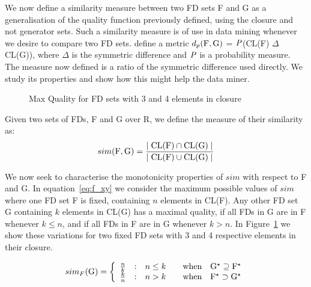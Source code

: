 We now define a similarity measure between two FD sets F and G as
a generalisation of the quality function previously defined, using the
closure and not generator sets. Such a
similarity measure is of use in data mining whenever we desire to
compare two FD sets. \cite{km95} define a metric $d_p({\rm F},{\rm G})$ = ${\it
P}$(CL(F) $\Delta$ CL(G)), where $\Delta$ is the symmetric difference and
${\it P}$ is a probability measure. The measure now defined is a
ratio of the symmetric difference used directly. We study its
properties and show how this might help the data miner.

\begin{figure}
\centerline{}
\caption{\label{graph:simquality}{Max Quality for FD sets with 3 and 4
elements in closure}}
\end{figure}

\begin{definition}
\begin{rm}
Given two sets of FDs, F and G over R, we define the measure of
their similarity as:
\begin{displaymath}
sim({\rm F}, {\rm G}) = \frac{\mid {\rm CL(F)} \cap {\rm CL(G)} \mid}{\mid {\rm CL(F)} \cup {\rm CL(G)} \mid }
\end{displaymath}
\end{rm}
\end{definition}

We now seek to characterise the monotonicity properties of $sim$ with respect
to F and G. In equation~\ref{eq:f_xy} we consider the maximum
possible values of $sim$ where one FD set F is fixed, containing $n$
elements in CL(F). Any other FD set G
containing $k$ elements in CL(G) has a maximal quality, 
if all FDs in G are in F
whenever $k \le n$, and if all FDs in F are in G whenever $k > n$.
In Figure~\ref{graph:simquality} we show 
these variations for two fixed FD sets with 3 and 4 respective
elements in their closure.

\begin{equation}\label{eq:f_xy}
sim_F({\rm G}) = \left\{ \begin{array}
		{l@{\quad:\quad}ll}
\frac{n}{k} & n \le k & \quad\mbox{when}\quad {\rm G}^\star \supseteq
		{\rm F}^\star\\ 
\frac{k}{n} & n > k   & \quad\mbox{when}\quad {\rm F}^\star \supset
		{\rm G}^\star\\ 
			\end{array}	\right.
\end{equation}

